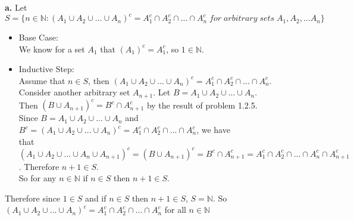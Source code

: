 \documentclass{article}
\begin{document}
{\Large \textbf{a.}} Let $S = \{n\in \mathbb{N}: (A_1\cup A_2\cup ...\cup A_n)^c = A^c_1\cap A^c_2\cap ...\cap A^c_n \;for \;arbitrary \;sets \;A_1, A_2, ... A_n\}$
\begin{center}
    \doublespacing
    \begin{itemize}
        \item Base Case:
        \\We know for a set $A_1$ that $(A_1)^c = A^c_1$, so $1\in \mathbb{N}$.
        \item Inductive Step:
        \\Assume that $n\in S$, then $(A_1\cup A_2\cup ...\cup A_n)^c = A^c_1\cap A^c_2\cap ...\cap A^c_n$.
        \\Consider another arbitrary set $A_{n+1}$. Let $B = A_1\cup A_2\cup ...\cup A_n$.
        \\Then $(B\cup A_{n+1})^c = B^c\cap A^c_{n+1}$ by the result of problem 1.2.5.
        \\Since $B = A_1\cup A_2\cup ...\cup A_n$ and $B^c = (A_1\cup A_2\cup ...\cup A_n)^c = A^c_1\cap A^c_2\cap ...\cap A^c_n$, we have 
        \\that $(A_1\cup A_2\cup ...\cup A_n\cup A_{n+1})^c = (B\cup A_{n+1})^c = B^c\cap A^c_{n+1} = A^c_1\cap A^c_2\cap ...\cap A^c_n\cap A^c_{n+1}$. Therefore $n+1\in S$.
        \\So for any $n\in \mathbb{N}$ if $n\in S$ then $n+1\in S$.
    \end{itemize}
    Therefore since $1\in S$ and if $n\in S$ then $n+1\in S$, $S = \mathbb{N}$. So $(A_1\cup A_2\cup ...\cup A_n)^c = A^c_1\cap A^c_2\cap ...\cap A^c_n$ for all $n\in \mathbb{N}$ \qedsymbol
\end{center}
\end{document}
